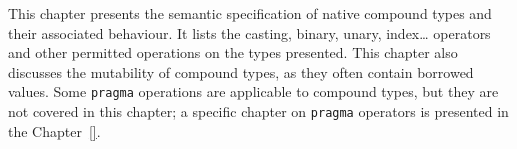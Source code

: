 \documentclass[a4paper,11pt]{book}
\begin{document}
This chapter presents the semantic specification of native compound types and
their associated behaviour. It lists the casting, binary, unary, index\ldots
operators and other permitted operations on the types presented. This chapter
also discusses the mutability of compound types, as they often contain borrowed
values. Some \texttt{pragma} operations are applicable to compound types, but
they are not covered in this chapter; a specific chapter on \texttt{pragma}
operators is presented in the Chapter~\ref{}.

\begin{multicols}{2}
  \minitoc%
  
\end{multicols}
\end{document}
